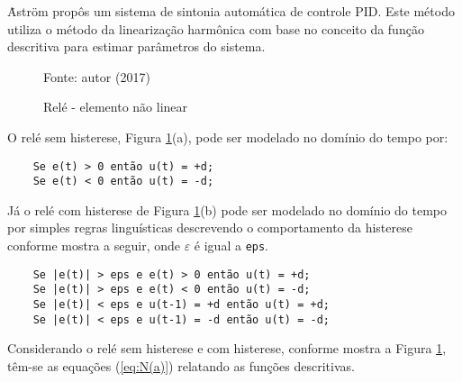 	\.{A}str\"{o}m propôs um sistema de sintonia automática de controle PID. Este método utiliza o método da linearização harmônica com base no conceito da função descritiva para estimar parâmetros do sistema.
	

\begin{figure}[!htb]
	\caption{\label{fig:reles}Relé - elemento não linear}	
	\begin{center}
		\hspace*{0.1\linewidth}
	\end{center}
	\centering
	\small Fonte: autor (2017)
\end{figure}


	O relé sem histerese, Figura \ref{fig:reles}(a), pode ser modelado no domínio do tempo por:
	
\begin{verbatim}
	Se e(t) > 0 então u(t) = +d;
	Se e(t) < 0 então u(t) = -d;
\end{verbatim}

Já o relé com histerese de Figura \ref{fig:reles}(b) pode ser modelado no domínio do tempo por simples regras linguísticas descrevendo o comportamento da histerese conforme mostra a seguir, onde $\varepsilon$ é igual a \verb+eps+.

\begin{verbatim}
	Se |e(t)| > eps e e(t) > 0 então u(t) = +d;
	Se |e(t)| > eps e e(t) < 0 então u(t) = -d;
	Se |e(t)| < eps e u(t-1) = +d então u(t) = +d;
	Se |e(t)| < eps e u(t-1) = -d então u(t) = -d;
\end{verbatim}

	Considerando o relé sem histerese e com histerese, conforme mostra a Figura \ref{fig:reles}, têm-se as equações (\ref{eq:N(a)}) relatando as funções descritivas.
	
